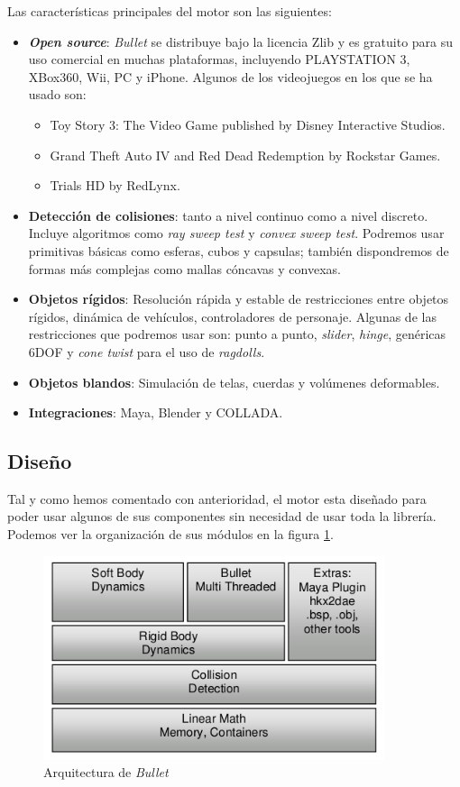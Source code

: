 \documentclass[12pt]{article}
\begin{document}
Las características principales del motor son las siguientes:
\begin{itemize}
  \item \textbf{\textit{Open source}}: \textit{Bullet} se distribuye bajo la licencia Zlib y es gratuito para su uso comercial en muchas plataformas, incluyendo PLAYSTATION 3, XBox360, Wii, PC y iPhone. Algunos de los videojuegos en los que se ha usado son:
    \begin{itemize}
      \item Toy Story 3: The Video Game published by Disney Interactive Studios.
      \item Grand Theft Auto IV and Red Dead Redemption by Rockstar Games.
      \item Trials HD by RedLynx.
    \end{itemize}
  \item \textbf{Detección de colisiones}: tanto a nivel continuo como a nivel discreto. Incluye algoritmos como \textit{ray sweep test} y \textit{convex sweep test}. Podremos usar primitivas básicas como esferas, cubos y capsulas; también dispondremos de formas más complejas como mallas cóncavas y convexas.
  \item \textbf{Objetos rígidos}: Resolución rápida y estable de restricciones entre objetos rígidos, dinámica de vehículos, controladores de personaje. Algunas de las restricciones que podremos usar son: punto a punto, \textit{slider}, \textit{hinge}, genéricas 6DOF y \textit{cone twist} para el uso de \textit{ragdolls}.
  \item \textbf{Objetos blandos}: Simulación de telas, cuerdas y volúmenes deformables. 
  \item \textbf{Integraciones}: Maya, Blender y COLLADA.
\end{itemize}

\subsection{Diseño}

Tal y como hemos comentado con anterioridad, el motor esta diseñado para poder usar algunos de sus componentes sin necesidad de usar toda la librería. Podemos ver la organización de sus módulos en la figura \ref{fig:diseno}.

\begin{figure}[h]
\begin{center}
 \includegraphics[width=10cm]{figures/diseno.png}
 \caption{Arquitectura de \textit{Bullet}}
 \label{fig:diseno}
\end{center}
\end{figure}
\end{document}
